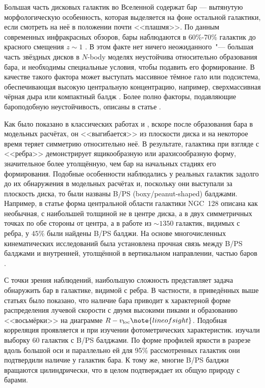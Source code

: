 \documentclass{trlnotes}
\begin{document}
Большая часть дисковых галактик во Вселенной содержат бар --- вытянутую морфологическую особенность, которая выделяется на фоне остальной галактики, если смотреть на неё в положении почти <<плашмя>>. По данным современных инфракрасных обзоров, бары наблюдаются в 60\%-70\% галактик до красного смещения $z\sim 1$ \citep{marinova2007}.  В этом факте нет ничего неожиданного~"--- большая часть звёздных дисков в $N$-body моделях неустойчива относительно образования бара, и необходимы специальные условия, чтобы подавить его формирование. В качестве такого фактора может выступать массивное тёмное гало или подсистема, обеспечивающая высокую центральную концентрацию, например, сверхмассивная чёрная дыра \citep{shen2004} или компактный балдж \citep{saha2018}. Более полно факторы, подавляющие бароподобную неустойчивость, описаны в статье \citet{sellwood2019}.

Как было показано в классических работах \citet{combes1981a} и \citet{raha1991}, вскоре после образования бара в модельных расчётах, он <<выгибается>> из плоскости диска и на некоторое время теряет симметрию относительно неё. В результате, галактика при взгляде с <<ребра>> демонстрирует ящикообразную или арахисообразную форму, значительное более утолщённую, чем бар на начальных стадиях его формирования. Подобные особенности наблюдались у реальных галактик задолго до их обнаружения в модельных расчётах и, поскольку они выступали за плоскость диска, то были названы B/PS (boxy/peanut-shaped) балджами. Например, в статье \citet{burbidge1959} форма центральной области галактики NGC~128 описана как необычная, с наибольшей толщиной не в центре диска, а в двух симметричных точках по обе стороны от центра, а в работе \citet{lutticke2000} из $\sim\!1350$ галактик, видимых с ребра, у $45\%$ были найдены B/PS балджи.  На основе многочисленных кинематических исследований была установлена прочная связь между B/PS балджами и внутренней, утолщённой в вертикальном направлении, частью баров \citep{kuijken1995,bureau1999,chung2004,bureau2006}. 

С точки зрения наблюдений, наибольшую сложность представляет задача обнаружить бар в галактике, видимой с ребра. В частности, в приведённых выше статьях было показано, что наличие бара приводит к характерной форме распределения лучевой скорости с двумя высокими пиками и образованию <<восьмёрки>> на диаграмме $R - v_{\text{loc}}\note{line of sight}$.  Подобная корреляция проявляется и при изучении фотометрических характеристик. \citet{lutticke2000a} изучали выборку 60 галактик с B/PS балджами. По форме профилей яркости в разрезе вдоль большой оси и параллельно ей для 95\% рассмотренных галактик они  подтвердили наличие у галактик бара.  К тому же, многие B/PS балджи вращаются цилиндрически, что в целом подтверждает их общую природу с барами. 
 
\end{document}
